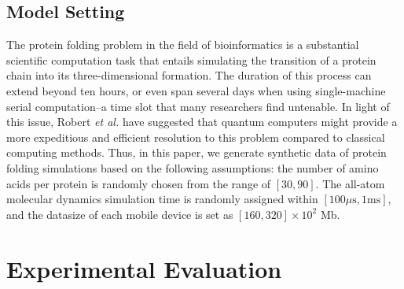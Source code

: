 \documentclass[journal]{IEEEtran}
\begin{document}
\subsection{Model Setting}
The protein folding problem in the field of bioinformatics is a substantial scientific computation task that entails simulating the transition of a protein chain into its three-dimensional formation.
The duration of this process can extend beyond ten hours, or even span several days when using single-machine serial computation--a time slot that many researchers find untenable.
In light of this issue, Robert {\em et al.} \cite{robert2021resource}  have suggested that quantum computers might provide a more expeditious and efficient resolution to this problem compared to classical computing methods.
Thus, in this paper, we generate synthetic data of protein folding simulations based on the following assumptions: the number of amino acids per protein is randomly chosen from the range of $[30, 90]$.
The all-atom molecular dynamics simulation time is randomly assigned within $[100\mu\text{s}, 1\text{ms}]$, and the datasize of each mobile device is set as $[160,320] \times 10^2$ Mb.


\section{Experimental Evaluation}
\end{document}
